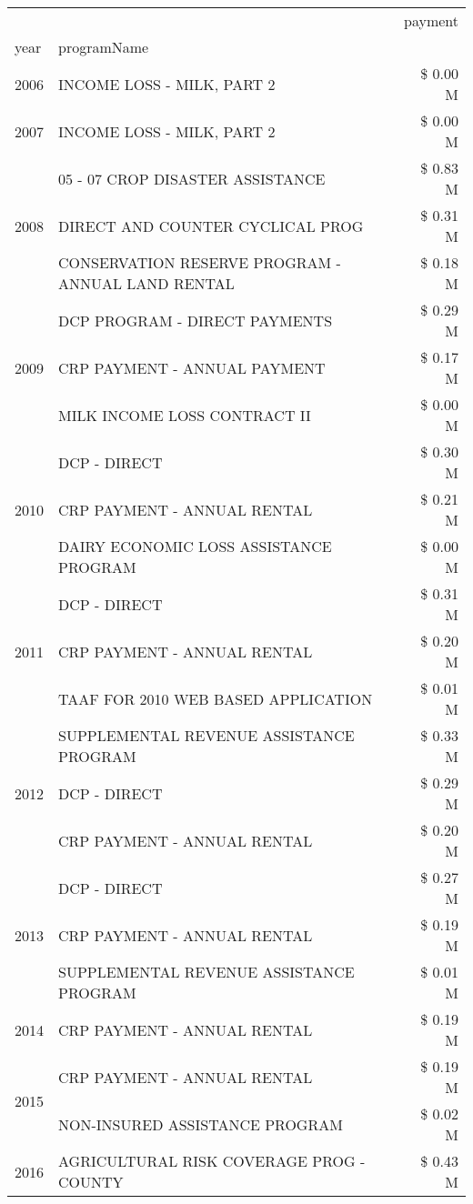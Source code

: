 \begin{tabular}{llr}
\toprule
 &  & payment \\
year & programName &  \\
\midrule
2006 & INCOME LOSS - MILK, PART 2 & \$ 0.00 M \\
\cline{1-3}
2007 & INCOME LOSS - MILK, PART 2 & \$ 0.00 M \\
\cline{1-3}
\multirow[t]{3}{*}{2008} & 05 - 07 CROP DISASTER ASSISTANCE & \$ 0.83 M \\
 & DIRECT AND COUNTER CYCLICAL PROG & \$ 0.31 M \\
 & CONSERVATION RESERVE PROGRAM - ANNUAL LAND RENTAL & \$ 0.18 M \\
\cline{1-3}
\multirow[t]{3}{*}{2009} & DCP PROGRAM - DIRECT PAYMENTS & \$ 0.29 M \\
 & CRP PAYMENT - ANNUAL PAYMENT & \$ 0.17 M \\
 & MILK INCOME LOSS CONTRACT II & \$ 0.00 M \\
\cline{1-3}
\multirow[t]{3}{*}{2010} & DCP - DIRECT & \$ 0.30 M \\
 & CRP PAYMENT - ANNUAL RENTAL & \$ 0.21 M \\
 & DAIRY ECONOMIC LOSS ASSISTANCE PROGRAM & \$ 0.00 M \\
\cline{1-3}
\multirow[t]{3}{*}{2011} & DCP - DIRECT & \$ 0.31 M \\
 & CRP PAYMENT - ANNUAL RENTAL & \$ 0.20 M \\
 & TAAF FOR 2010 WEB BASED APPLICATION & \$ 0.01 M \\
\cline{1-3}
\multirow[t]{3}{*}{2012} & SUPPLEMENTAL REVENUE ASSISTANCE PROGRAM & \$ 0.33 M \\
 & DCP - DIRECT & \$ 0.29 M \\
 & CRP PAYMENT - ANNUAL RENTAL & \$ 0.20 M \\
\cline{1-3}
\multirow[t]{3}{*}{2013} & DCP - DIRECT & \$ 0.27 M \\
 & CRP PAYMENT - ANNUAL RENTAL & \$ 0.19 M \\
 & SUPPLEMENTAL REVENUE ASSISTANCE PROGRAM & \$ 0.01 M \\
\cline{1-3}
2014 & CRP PAYMENT - ANNUAL RENTAL & \$ 0.19 M \\
\cline{1-3}
\multirow[t]{2}{*}{2015} & CRP PAYMENT - ANNUAL RENTAL & \$ 0.19 M \\
 & NON-INSURED ASSISTANCE PROGRAM & \$ 0.02 M \\
\cline{1-3}
\multirow[t]{3}{*}{2016} & AGRICULTURAL RISK COVERAGE PROG - COUNTY & \$ 0.43 M \\

\end{tabular}
